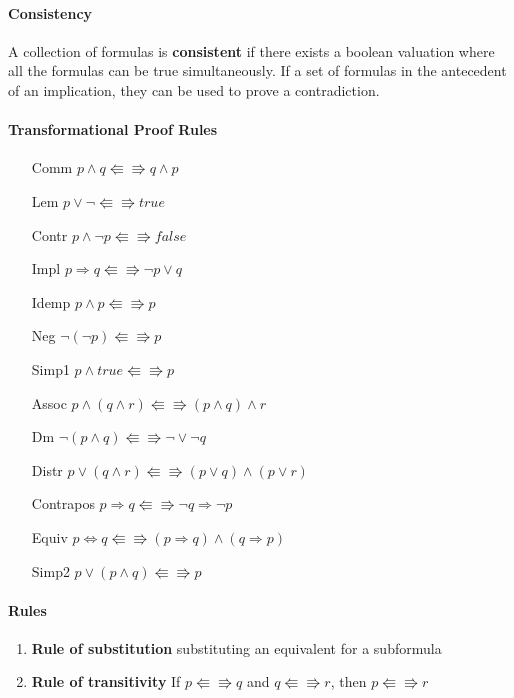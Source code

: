 \documentclass[12pt]{report}
\begin{document}
    \paragraph{Consistency} A collection of formulas is \textbf{consistent}
    if there exists a boolean valuation where all the formulas can be true
    simultaneously. If a set of formulas in the antecedent of an
    implication, they can be used to prove a contradiction.

    \paragraph{Transformational Proof Rules}
    \begin{itemize}
      \item[Comm] $p\land q \Lleftarrow\Rrightarrow q\land p$
      \item[Lem] $p\lor\lnot \Lleftarrow\Rrightarrow true$
      \item[Contr] $p\land\lnot p\Lleftarrow\Rrightarrow false$
      \item[Impl] $p \Rightarrow q\Lleftarrow\Rrightarrow \lnot p \lor q$
      \item[Idemp] $p \land p\Lleftarrow\Rrightarrow p$
      \item[Neg] $\lnot(\lnot p)\Lleftarrow\Rrightarrow p$
      \item[Simp1] $p\land true\Lleftarrow\Rrightarrow p$
      \item[Assoc] $p \land (q \land r)\Lleftarrow\Rrightarrow (p \land q)
        \land r$
      \item[Dm] $\lnot(p\land q)\Lleftarrow\Rrightarrow \lnot \lor \lnot q$
      \item[Distr] $p \lor (q \land r)\Lleftarrow\Rrightarrow (p \lor q)
        \land (p \lor r)$
      \item[Contrapos] $p \Rightarrow q\Lleftarrow\Rrightarrow \lnot q
        \Rightarrow \lnot p$
      \item[Equiv] $p \Leftrightarrow q\Lleftarrow\Rrightarrow (p\Rightarrow
        q) \land (q \Rightarrow p)$
      \item[Simp2] $p \lor (p \land q)\Lleftarrow\Rrightarrow p$
    \end{itemize}

    \paragraph{Rules}
      \begin{enumerate}
        \item \textbf{Rule of substitution} substituting an equivalent for a
          subformula
        \item \textbf{Rule of transitivity} If $p\Lleftarrow\Rrightarrow q$ and
          $q\Lleftarrow\Rrightarrow r$, then $p\Lleftarrow\Rrightarrow r$
      \end{enumerate}
\end{document}
